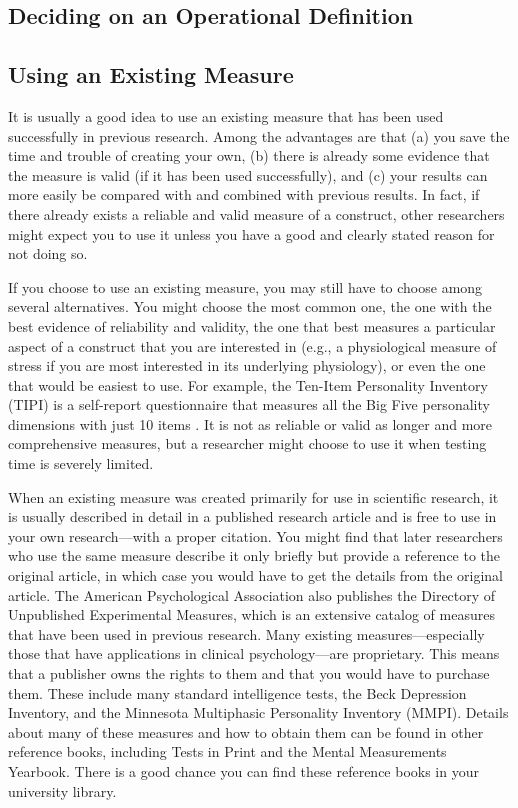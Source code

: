 \subsection{Deciding on an Operational Definition}

\subsection{Using an Existing Measure}

It is usually a good idea to use an existing measure that has been used successfully in previous research. Among the advantages are that (a) you save the time and trouble of creating your own, (b) there is already some evidence that the measure is valid (if it has been used successfully), and (c) your results can more easily be compared with and combined with previous results. In fact, if there already exists a reliable and valid measure of a construct, other researchers might expect you to use it unless you have a good and clearly stated reason for not doing so.

If you choose to use an existing measure, you may still have to choose among several alternatives. You might choose the most common one, the one with the best evidence of reliability and validity, the one that best measures a particular aspect of a construct that you are interested in (e.g., a physiological measure of stress if you are most interested in its underlying physiology), or even the one that would be easiest to use. For example, the Ten-Item Personality Inventory (TIPI) is a self-report questionnaire that measures all the Big Five personality dimensions with just 10 items \citep{gosling_very_2003}. It is not as reliable or valid as longer and more comprehensive measures, but a researcher might choose to use it when testing time is severely limited.

When an existing measure was created primarily for use in scientific research, it is usually described in detail in a published research article and is free to use in your own research—with a proper citation. You might find that later researchers who use the same measure describe it only briefly but provide a reference to the original article, in which case you would have to get the details from the original article. The American Psychological Association also publishes the Directory of Unpublished Experimental Measures, which is an extensive catalog of measures that have been used in previous research. Many existing measures—especially those that have applications in clinical psychology—are proprietary. This means that a publisher owns the rights to them and that you would have to purchase them. These include many standard intelligence tests, the Beck Depression Inventory, and the Minnesota Multiphasic Personality Inventory (MMPI). Details about many of these measures and how to obtain them can be found in other reference books, including Tests in Print and the Mental Measurements Yearbook. There is a good chance you can find these reference books in your university library.

